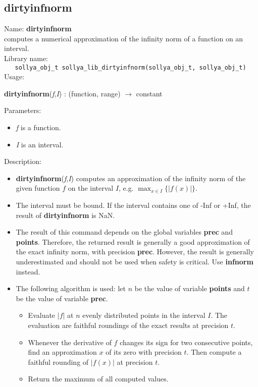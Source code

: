 \subsection{dirtyinfnorm}
\label{labdirtyinfnorm}
\noindent Name: \textbf{dirtyinfnorm}\\
\phantom{aaa}computes a numerical approximation of the infinity norm of a function on an interval.\\[0.2cm]
\noindent Library name:\\
\verb|   sollya_obj_t sollya_lib_dirtyinfnorm(sollya_obj_t, sollya_obj_t)|\\[0.2cm]
\noindent Usage: 
\begin{center}
\textbf{dirtyinfnorm}(\emph{f},\emph{I}) : (\textsf{function}, \textsf{range}) $\rightarrow$ \textsf{constant}\\
\end{center}
Parameters: 
\begin{itemize}
\item \emph{f} is a function.
\item \emph{I} is an interval.
\end{itemize}
\noindent Description: \begin{itemize}

\item \textbf{dirtyinfnorm}(\emph{f},\emph{I}) computes an approximation of the infinity norm of the 
   given function $f$ on the interval $I$, e.g. $\max_{x \in I} \{|f(x)|\}$.

\item The interval must be bound. If the interval contains one of -Inf or +Inf, the 
   result of \textbf{dirtyinfnorm} is NaN.

\item The result of this command depends on the global variables \textbf{prec} and \textbf{points}.
   Therefore, the returned result is generally a good approximation of the exact
   infinity norm, with precision \textbf{prec}. However, the result is generally 
   underestimated and should not be used when safety is critical.
   Use \textbf{infnorm} instead.

\item The following algorithm is used: let $n$ be the value of variable \textbf{points}
   and $t$ be the value of variable \textbf{prec}.
   \begin{itemize}
   \item Evaluate $|f|$ at $n$ evenly distributed points in the
     interval $I$. The evaluation are faithful roundings of the exact
     results at precision $t$.
   \item Whenever the derivative of $f$ changes its sign for two consecutive 
     points, find an approximation $x$ of its zero with precision $t$.
     Then compute a faithful rounding of $|f(x)|$ at precision $t$.
   \item Return the maximum of all computed values.
   \end{itemize}
\end{itemize}
